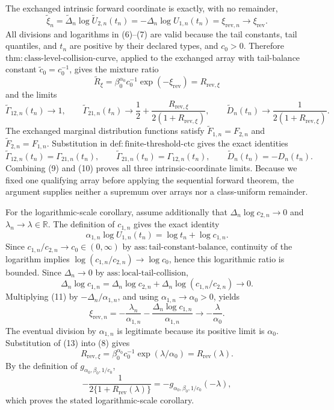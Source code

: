 The exchanged intrinsic forward coordinate is exactly, with no remainder,
\[
\widetilde\xi_n
=\widetilde\Delta_n\log\widetilde U_{2,n}(t_n)
=-\Delta_n\log U_{1,n}(t_n)
=\xi_{\mathrm{rev},n}
\longrightarrow\xi_{\mathrm{rev}}.
\tag{7}
\]
All divisions and logarithms in (6)--(7) are valid because the tail constants, tail quantiles, and \(t_n\) are positive by their declared types, and \(c_0>0\). Therefore \(\mathrm{thm{:}class\text{-}level\text{-}collision\text{-}curve}\), applied to the exchanged array with tail-balance constant \(\widetilde c_0=c_0^{-1}\), gives the mixture ratio
\[
\widetilde R_\xi
=\beta_0^{\alpha_0}c_0^{-1}\exp(-\xi_{\mathrm{rev}})
=R_{\mathrm{rev},\xi}
\tag{8}
\]
and the limits
\[
\widetilde\Gamma_{12,n}(t_n)\longrightarrow1,
\qquad
\widetilde\Gamma_{21,n}(t_n)\longrightarrow
\frac12+\frac{R_{\mathrm{rev},\xi}}{2(1+R_{\mathrm{rev},\xi})},
\qquad
\widetilde D_n(t_n)\longrightarrow
\frac{1}{2(1+R_{\mathrm{rev},\xi})}.
\tag{9}
\]
The exchanged marginal distribution functions satisfy \(\widetilde F_{1,n}=F_{2,n}\) and \(\widetilde F_{2,n}=F_{1,n}\). Substitution in \(\mathrm{def{:}finite\text{-}threshold\text{-}ctc}\) gives the exact identities
\[
\widetilde\Gamma_{12,n}(t_n)=\Gamma_{21,n}(t_n),
\qquad
\widetilde\Gamma_{21,n}(t_n)=\Gamma_{12,n}(t_n),
\qquad
\widetilde D_n(t_n)=-D_n(t_n).
\tag{10}
\]
Combining (9) and (10) proves all three intrinsic-coordinate limits. Because we fixed one qualifying array before applying the sequential forward theorem, the argument supplies neither a supremum over arrays nor a class-uniform remainder.

For the logarithmic-scale corollary, assume additionally that \(\Delta_n\log c_{2,n}\to0\) and \(\lambda_n\to\lambda\in\mathbb R\). The definition of \(c_{1,n}\) gives the exact identity
\[
\alpha_{1,n}\log U_{1,n}(t_n)=\log t_n+\log c_{1,n}.
\tag{11}
\]
Since \(c_{1,n}/c_{2,n}\to c_0\in(0,\infty)\) by \(\mathrm{ass{:}tail\text{-}constant\text{-}balance}\), continuity of the logarithm implies \(\log(c_{1,n}/c_{2,n})\to\log c_0\), hence this logarithmic ratio is bounded. Since \(\Delta_n\to0\) by \(\mathrm{ass{:}local\text{-}tail\text{-}collision}\),
\[
\Delta_n\log c_{1,n}
=\Delta_n\log c_{2,n}
+\Delta_n\log(c_{1,n}/c_{2,n})
\longrightarrow0.
\tag{12}
\]
Multiplying (11) by \(-\Delta_n/\alpha_{1,n}\), and using \(\alpha_{1,n}\to\alpha_0>0\), yields
\[
\xi_{\mathrm{rev},n}
=-\frac{\lambda_n}{\alpha_{1,n}}
-\frac{\Delta_n\log c_{1,n}}{\alpha_{1,n}}
\longrightarrow-\frac{\lambda}{\alpha_0}.
\tag{13}
\]
The eventual division by \(\alpha_{1,n}\) is legitimate because its positive limit is \(\alpha_0\). Substitution of (13) into (8) gives
\[
R_{\mathrm{rev},\xi}
=\beta_0^{\alpha_0}c_0^{-1}\exp(\lambda/\alpha_0)
=R_{\mathrm{rev}}(\lambda).
\tag{14}
\]
By the definition of \(g_{\alpha_0,\beta_0,1/c_0}\),
\[
-\frac{1}{2\{1+R_{\mathrm{rev}}(\lambda)\}}
=-g_{\alpha_0,\beta_0,1/c_0}(-\lambda),
\tag{15}
\]
which proves the stated logarithmic-scale corollary.

